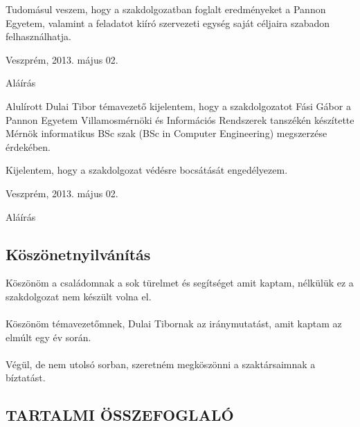 \documentclass[a4paper,12pt,oneside]{report}
\begin{document}
Tudomásul veszem, hogy a szakdolgozatban foglalt eredményeket a Pannon Egyetem, valamint a feladatot kiíró szervezeti egység saját céljaira szabadon felhasználhatja.\\

\begin{flushleft}
{Veszprém, 2013. május 02.\\}
\end{flushleft}

\begin{flushright}
{Aláírás \vspace{4cm}}
\end{flushright}

Alulírott Dulai Tibor témavezető kijelentem, hogy a szakdolgozatot Fási Gábor a Pannon Egyetem Villamosmérnöki és Információs Rendszerek tanszékén készítette Mérnök informatikus BSc szak (BSc in Computer Engineering) megszerzése érdekében.

Kijelentem, hogy a szakdolgozat védésre bocsátását engedélyezem.\\

\begin{flushleft}
{Veszprém, 2013. május 02.\\}
\end{flushleft}

\begin{flushright}
{Aláírás}
\end{flushright}
\newpage
\pagebreak
\begin{center}
\section*{Köszönetnyilvánítás}
\end{center}

Köszönöm a családomnak a sok türelmet és segítséget amit kaptam, nélkülük ez a szakdolgozat nem készült volna el.
\\
\\
Köszönöm témavezetőmnek, Dulai Tibornak az iránymutatást, amit kaptam az elmúlt egy év során.
\\
\\
Végül, de nem utolsó sorban, szeretném megköszönni a szaktársaimnak a bíztatást.

\newpage

\begin{center}
\section*{\textbf{\Large \MakeUppercase{Tartalmi összefoglaló}}}
\end{center}
\end{document}
